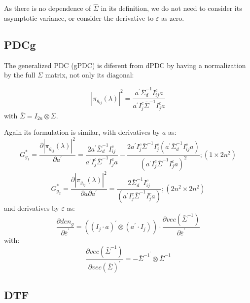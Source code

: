 \documentclass[a4paper,10pt]{article}
\begin{document}
As there is no dependence of $\hat{\Sigma}$ in its definition, we do not need to consider its asymptotic variance, or consider the derivative to $\varepsilon$ as zero.

\subsection{PDCg}

The generalized PDC (gPDC) is diferent from dPDC by having a normalization by the full $\Sigma$ matrix, not only its diagonal:

\begin{equation}
 |\pi_{g_{ij}}(\lambda)|^{2}  = \frac{a^{'} \bar{\Sigma}_{d}^{-1} I_{ij}^{c} a}{a^{'} I_{j}^{c} \bar{\Sigma}^{-1} I_{j}^{c} a}
\end{equation}
with $\bar{\Sigma} = I_{2n} \otimes \Sigma$.

Again its formulation is similar, with derivatives by $a$ as:
\begin{equation}
G_{g_1}^{\ast} = \frac{\partial |\pi_{g_{ij}}(\lambda)|^{2}}{\partial a^{'}} = \frac{2 a^{'} \bar{\Sigma}_{d}^{-1} I_{ij}^{c}} {a^{'} I_{j}^{c} \bar{\Sigma}^{-1} I_{j}^{c} a} - \frac{2 a^{'} I_{j}^{c} \bar{\Sigma}^{-1} I_{j}^{c} (a^{'} \bar{\Sigma}_{d}^{-1} I_{ij}^{c} a)} {(a^{'} I_{j}^{c} \bar{\Sigma}^{-1} I_{j}^{c} a)^{2}}; (1 \times 2n^{2})
\end{equation}
\begin{equation}
G_{g_2}^{\ast} = \frac{\partial |\pi_{g_{ij}}(\lambda)|^{2}}{\partial a \partial a^{'}} = \frac{2 \bar{\Sigma}_{d}^{-1} I_{ij}^{c}}{(a^{'} I_{j}^{c} \bar{\Sigma}^{-1} I_{j}^{c} a)}; (2n^{2} \times 2n^{2})
\end{equation}
and derivatives by $\varepsilon$ as:
\begin{equation}
\frac{\partial den_{g}}{\partial \bar{\varepsilon}^{'}} = ((I_{j} \cdot a)^{'} \otimes (a^{'} \cdot I_{j})) \cdot \frac{\partial vec(\bar{\Sigma}^{-1})}{\partial \bar{\varepsilon}^{'}}
\end{equation}
with:
\begin{equation}
\frac{\partial vec(\bar{\Sigma}^{-1})}{\partial vec(\bar{\Sigma})^{'}} = -\bar{\Sigma}^{-1^{'}} \otimes \bar{\Sigma}^{-1}
\end{equation}

\subsection{DTF}
\end{document}
